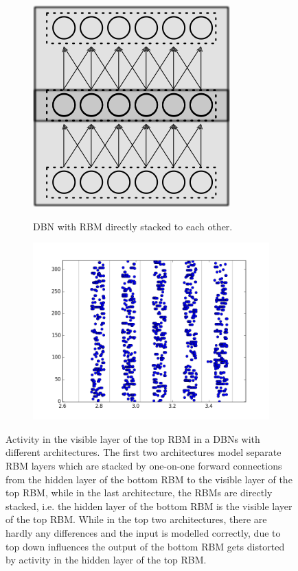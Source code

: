 \begin{figure}[h!]
	
	\begin{subfigure}[t]{.49\textwidth}
  		\centering
  		\includegraphics[width=.50\linewidth]{imgs/app/dbn_np_arch.png}
  		\label{fig:sub1}
  		 \caption{DBN with RBM directly stacked to each other.}
	\end{subfigure}%
	\begin{subfigure}[t]{.49\textwidth}
  		\centering
  		\includegraphics[width=.9\linewidth]{imgs/app/DBN_np_sp.png}
  		\label{fig:sub2}
	\end{subfigure}
	\caption{Activity in the visible layer of the top RBM in a DBNs with different architectures. The first two architectures model separate RBM layers which are stacked by one-on-one forward connections from the hidden layer of the bottom RBM to the visible layer of the top RBM, while in the last architecture, the RBMs are directly stacked, i.e. the hidden layer of the bottom RBM is the visible layer of the top RBM. While in the top two architectures, there are hardly any differences and the input is modelled correctly, due to top down influences the output of the bottom RBM gets distorted by activity in the hidden layer of the top RBM.}
	\label{fig:spikingdbnarch}
\end{figure}


